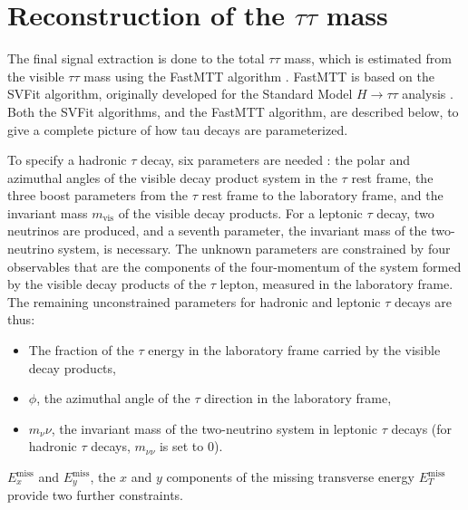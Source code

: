 \section{Reconstruction of the $\tau\tau$ mass}

The final signal extraction is done to the total $\tau\tau$ mass, which is estimated from the visible $\tau\tau$ mass using the FastMTT algorithm \cite{2014_SVFit_Bianchini}. FastMTT is based on the SVFit algorithm, originally developed for the Standard Model $H \rightarrow \tau\tau$ analysis \cite{CMS-HIG-13-004}. Both the SVFit algorithms, and the FastMTT algorithm, are described below, to give a complete picture of how tau decays are parameterized.

To specify a hadronic $\tau$ decay, six parameters are needed \cite{CMS-HIG-13-004}: the polar and azimuthal angles of the visible decay product system in the $\tau$ rest frame, the three boost parameters from the $\tau$ rest frame to the laboratory frame, and the invariant mass $m_{\text{vis}}$ of the visible decay products. For a leptonic $\tau$ decay, two neutrinos are produced, and a seventh parameter, the invariant mass of the two-neutrino system, is necessary. The unknown parameters are constrained by four observables that are the components of the four-momentum of the system formed by the visible decay products of the $\tau$ lepton, measured in the laboratory frame. The remaining unconstrained parameters for hadronic and leptonic $\tau$ decays are thus:

\begin{itemize}
    \item The fraction of the $\tau$ energy in the laboratory frame carried by the visible decay products,
    \item $\phi$, the azimuthal angle of the $\tau$ direction in the laboratory frame,
    \item $m_\nu\nu$, the invariant mass of the two-neutrino system in leptonic $\tau$ decays (for hadronic $\tau$ decays, $m_{\nu\nu}$ is set to 0).
\end{itemize}
$E_{x}^{\text{miss}}$ and $E_{y}^{\text{miss}}$, the $x$ and $y$ components of the missing transverse energy $E_{T}^{\text{miss}}$ provide two further constraints. 

